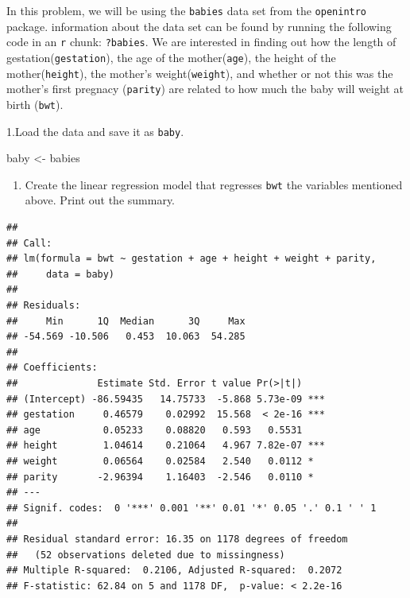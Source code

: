 \documentclass[]{article}
\newenvironment{Shaded}{\begin{snugshade}}{\end{snugshade}}
\newcommand{\DataTypeTok}[1]{\textcolor[rgb]{0.13,0.29,0.53}{#1}}
\newcommand{\KeywordTok}[1]{\textcolor[rgb]{0.13,0.29,0.53}{\textbf{#1}}}
\newcommand{\NormalTok}[1]{#1}
\newcommand{\OperatorTok}[1]{\textcolor[rgb]{0.81,0.36,0.00}{\textbf{#1}}}
\newcommand{\StringTok}[1]{\textcolor[rgb]{0.31,0.60,0.02}{#1}}
\providecommand{\tightlist}{%
  \setlength{\itemsep}{0pt}\setlength{\parskip}{0pt}}
\begin{document}
In this problem, we will be using the \texttt{babies} data set from the
\texttt{openintro} package. information about the data set can be found
by running the following code in an \texttt{r} chunk: \texttt{?babies}.
We are interested in finding out how the length of
gestation(\texttt{gestation}), the age of the mother(\texttt{age}), the
height of the mother(\texttt{height}), the mother's
weight(\texttt{weight}), and whether or not this was the mother's first
pregnacy (\texttt{parity}) are related to how much the baby will weight
at birth (\texttt{bwt}).

1.Load the data and save it as \texttt{baby}.

\begin{Shaded}
\begin{Highlighting}[]
\NormalTok{baby <-}\StringTok{ }\NormalTok{babies}
\end{Highlighting}
\end{Shaded}

\begin{enumerate}
\def\labelenumi{\arabic{enumi}.}
\setcounter{enumi}{1}
\tightlist
\item
  Create the linear regression model that regresses \texttt{bwt} the
  variables mentioned above. Print out the summary.
\end{enumerate}

\begin{Shaded}
\end{Shaded}

\begin{verbatim}
## 
## Call:
## lm(formula = bwt ~ gestation + age + height + weight + parity, 
##     data = baby)
## 
## Residuals:
##     Min      1Q  Median      3Q     Max 
## -54.569 -10.506   0.453  10.063  54.285 
## 
## Coefficients:
##              Estimate Std. Error t value Pr(>|t|)    
## (Intercept) -86.59435   14.75733  -5.868 5.73e-09 ***
## gestation     0.46579    0.02992  15.568  < 2e-16 ***
## age           0.05233    0.08820   0.593   0.5531    
## height        1.04614    0.21064   4.967 7.82e-07 ***
## weight        0.06564    0.02584   2.540   0.0112 *  
## parity       -2.96394    1.16403  -2.546   0.0110 *  
## ---
## Signif. codes:  0 '***' 0.001 '**' 0.01 '*' 0.05 '.' 0.1 ' ' 1
## 
## Residual standard error: 16.35 on 1178 degrees of freedom
##   (52 observations deleted due to missingness)
## Multiple R-squared:  0.2106, Adjusted R-squared:  0.2072 
## F-statistic: 62.84 on 5 and 1178 DF,  p-value: < 2.2e-16
\end{verbatim}
\end{document}
